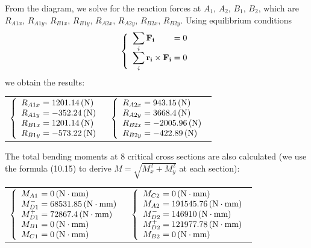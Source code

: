 From the diagram, we solve for the reaction forces at $ A_1 $, $ A_2 $, $ B_1 $, $ B_2 $, which are $ R_{A1x} $, $ R_{A1y} $, $ R_{B1x} $, $ R_{B1y} $, $ R_{A2x} $, $ R_{A2y} $, $ R_{B2x} $, $ R_{B2y} $. Using equilibrium conditions
\[
\left\{ 
\begin{array}{l@{{}={}}l}
\displaystyle\sum_{i} \mathbf{F_{i}} & 0\\
\displaystyle\sum_{i} \mathbf{r_i}\times \mathbf{F_i}& 0\\
\end{array}
\right.
\]
we obtain the results:\vskip2mm
{\centering
	\begin{tabular}[ht]{p{7cm}p{7cm}}
		$
		\left\{ 
		\begin{array}{l@{{} = {}}l}
		R_{A1x} & 1201.14\unitp{N}\\
		R_{A1y} & -352.24\unitp{N}\\
		R_{B1x} & 1201.14\unitp{N}\\
		R_{B1y} & -573.22\unitp{N}\\
		\end{array}
		\right.
		$ & $
		\left\{ 
		\begin{array}{l@{{} = {}}l}
		R_{A2x} & 943.15\unitp{N}\\
		R_{A2y} & 3668.4 \unitp{N}\\
		R_{B2x} & -2005.96 \unitp{N}\\
		R_{B2y} & -422.89 \unitp{N}\\
		\end{array}
		\right.
		$
\end{tabular}}\vskip2mm
The total bending moments at 8 critical cross sections are also calculated (we use the formula (10.15) to derive $M=\sqrt{M_x^2+M_y^2}$ at each section):\vskip2mm
{\centering
	\begin{tabular}[ht]{p{7cm}p{7cm}}
		$
		\left\{ 
		\begin{array}{l@{{} = {}}l}
		M_{A1} & 0 \unit{(N\cdot mm)}\\
		M_{D1}^- & 68531.85 \unit{(N\cdot mm)}\\
		M_{D1}^+ & 72867.4 \unit{(N\cdot mm)}\\
		M_{B1} & 0 \unit{(N\cdot mm)}\\
		M_{C1} & 0 \unit{(N\cdot mm)}\\
		\end{array}
		\right.
		$ &
		$
		\left\{ 
		\begin{array}{l@{{} = {}}l}
		M_{C2} & 0 \unit{(N\cdot mm)}\\
		M_{A2} & 191545.76 \unit{(N\cdot mm)}\\
		M_{D2}^- & 146910 \unit{(N\cdot mm)}\\
		M_{D2}^+ & 121977.78 \unit{(N\cdot mm)}\\
		M_{B2} & 0 \unit{(N\cdot mm)}\\
		\end{array}
		\right.
		$
\end{tabular}}\vskip2mm


